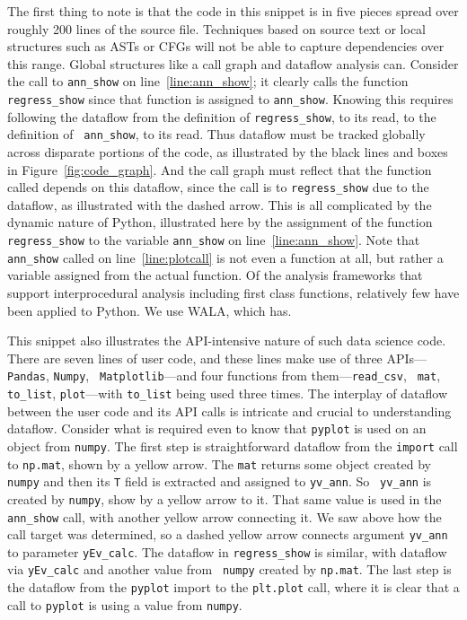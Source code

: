  The first thing to note is that the code in this snippet is in five
pieces spread over roughly 200 lines of the source file.  Techniques
based on source text or local structures such as ASTs or CFGs will not
be able to capture dependencies over this range.  Global structures like a
call graph and dataflow analysis can.  Consider the call to {\tt ann\_show} on
line~\ref{line:ann_show}; it clearly calls the function {\tt
regress\_show} since that function is assigned to {\tt ann\_show}.
Knowing this requires following the dataflow from the definition of
{\tt regress\_show}, to its read, to the definition of {\tt
ann\_show}, to its read.  Thus dataflow must be tracked globally
across disparate portions of the code, as illustrated by the black
lines and boxes in Figure~\ref{fig:code_graph}.  And the call graph
must reflect that the function called depends on this dataflow, since
the call is to {\tt regress\_show} due to the dataflow, as illustrated
with the dashed arrow.  This is all complicated by the dynamic
nature of Python, illustrated here by the assignment of the function
{\tt regress\_show} to the variable {\tt ann\_show} on
line~\ref{line:ann_show}.  Note that {\tt ann\_show} called on
line~\ref{line:plotcall} is not even a function at all, but rather a variable
assigned from the actual function.  Of the analysis frameworks that
support interprocedural analysis including first class functions,
relatively few have been applied to Python.  We use WALA, which has.

This snippet also illustrates the API-intensive nature of such data
science code.  There are seven lines of user code, and these lines
make use of three APIs---{\tt Pandas}, {\tt Numpy}, {\tt
Matplotlib}---and four functions from them---{\tt read\_csv}, {\tt
mat}, {\tt to\_list}, {\tt plot}---with {\tt to\_list} being used
three times.  The interplay of dataflow between the user code and its
API calls is intricate and crucial to understanding dataflow.
Consider what is required even to know that {\tt pyplot} is used on an
object from {\tt numpy}.  The first step is straightforward dataflow
from the {\tt import} call to {\tt np.mat}, shown by a yellow arrow.
The {\tt mat} returns some object created by {\tt numpy} and then its
{\tt T} field is extracted and assigned to {\tt yv\_ann}.  So {\tt
yv\_ann} is created by {\tt numpy}, show by a yellow arrow to it.
That same value is used in the {\tt ann\_show} call, with another
yellow arrow connecting it.  We saw above how the call target was
determined, so a dashed yellow arrow connects argument {\tt yv\_ann}
to parameter {\tt yEv\_calc}.  The dataflow in {\tt regress\_show} is
similar, with dataflow via {\tt yEv\_calc} and another value from {\tt
numpy} created by {\tt np.mat}.  The last step is the dataflow from
the {\tt pyplot} import to the {\tt plt.plot} call, where it is clear
that a call to {\tt pyplot} is using a value from {\tt numpy}.

